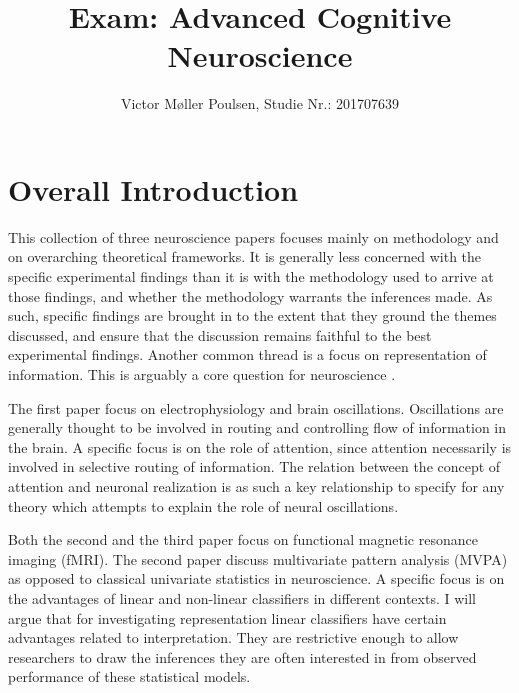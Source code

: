 \documentclass[12pt]{article} %
\begin{document}
\title{Exam: Advanced Cognitive Neuroscience}
\author{Victor Møller Poulsen, Studie Nr.: 201707639}

\maketitle
\leavevmode
\section{Overall Introduction}

This collection of three neuroscience papers
focuses mainly on methodology and on
overarching theoretical frameworks. It is
generally less concerned with the specific
experimental findings than
it is with the methodology used to arrive
at those findings, and whether the methodology
warrants the inferences made. As such, specific
findings are brought in to the extent that they
ground the themes discussed, and ensure that the
discussion remains faithful to the best
experimental findings. Another common thread is
a focus on representation of information.
This is arguably a core question for neuroscience
\autocite{norman2006beyond}.

\vspace{3mm}

The first paper
focus on electrophysiology and brain oscillations.
Oscillations are generally thought to be
involved in routing and controlling flow
of information in the brain. A specific focus
is on the role of attention, since attention
necessarily is involved in selective routing
of information. The relation between the
concept of attention and neuronal realization
is as such a key relationship to specify for
any theory which attempts to explain the
role of neural oscillations.

\vspace{3mm}

Both the second and the third paper focus
on functional magnetic resonance imaging (fMRI).
The second paper discuss multivariate
pattern analysis (MVPA) as opposed to
classical univariate statistics in neuroscience.
A specific focus is on the advantages of linear and
non-linear classifiers in different contexts.
I will argue that for investigating representation
linear classifiers have certain advantages related
to interpretation. They are restrictive enough
to allow researchers to draw the inferences they
are often interested in from observed performance
of these statistical models.
\end{document}
